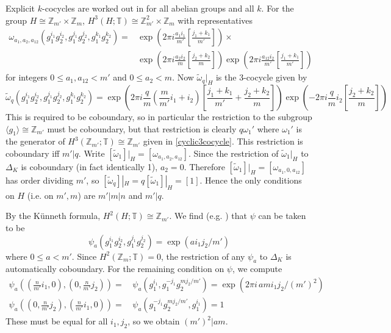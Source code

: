 \documentclass[12pt]{article}
\numberwithin{equation}{section}
\def\bbT           {\mathbb{T}}
\def\bbZ           {\mathbb{Z}}
\begin{document}
Explicit $k$-cocycles are worked out in \cite{HWY} for all abelian groups and all $k$. 
For the group $H\cong\bbZ_{m'}\times\bbZ_m$, $H^3(H;\bbT)\cong \bbZ_{m'}^2\times\bbZ_m$
with representatives
\begin{align}\omega_{a_1,a_2,a_{12}}(g_1^{i_1}g_2^{i_2},g_1^{j_1}g_2^{j_2},g_1^{k_1}g_2^{k_2})=&
\exp\left(2\pi i \frac{a_1i_1}{m'}\left[\frac{j_1+k_1}{m'}\right]\right)\times\nonumber\\ &\exp\left(2\pi i \frac{a_2i_2}{m}\left[\frac{j_2+k_2}{m}\right]\right)
\exp\left(2\pi i \frac{a_{12}i_2}{m'}\left[\frac{j_1+k_1}{m'}\right]\right)\nonumber\end{align}
for integers $0\le a_1,a_{12}<m'$ and $0\le a_2<m$.
Now $\widetilde{\omega}_q|_H$ is the 3-cocycle given by
$$\widetilde{\omega}_q(g_1^{i_1}g_2^{i_2},g_1^{j_1}g_2^{j_2},g_1^{k_1}g_2^{k_2})=\exp\left(2\pi i \frac{q}{m}(\frac{m}{m'}i_1+i_2)\left[\frac{j_1+k_1}{m'}+\frac{j_2+k_2}{m}\right]\right)\exp\left(-2\pi i \frac{q}{m}i_2\left[\frac{j_2+k_2}{m}\right]\right)$$
This is required to be coboundary, so in particular the restriction to the subgroup $\langle g_1\rangle \cong \bbZ_{m'}$ must
be coboundary, but that restriction is clearly $q\omega_1'$ where $\omega_1'$ is the generator of $H^3(\bbZ_{m'};\bbT)\cong\bbZ_{m'}$ given in \eqref{cyclic3cocycle}. This restriction is coboundary iff $m'|q$.
Write $[\tilde{\omega}_1]|_H=[\omega_{a_1,a_2,a_{12}}]$. Since the restriction of $\tilde{\omega}_1|_H$ to $\Delta_K$ is coboundary (in fact identically 1), $a_2=0$. Therefore $[\tilde{\omega}_1]|_H=[\omega_{a_1,0,a_{12}}]$ has order dividing $m'$, so  $[\tilde{\omega}_q]|_H=q[\tilde{\omega}_1]|_H
=[1]$. Hence the only conditions on $H$ (i.e. on $m',m$) are $m'|m|n$ and $m'|q$.

By the K\"unneth formula, $H^2(H;\bbT)\cong \bbZ_{m'}$. We find (e.g. \cite{HWY}) that $\psi$ can be taken to be
$$\psi_a(g_1^{i_1}g_2^{i_2},g_1^{j_1}g_2^{j_2})=\exp\left(ai_1j_2/m'\right)$$ 
where $0\le a<m'$.  Since $H^2(\bbZ_m;\bbT)=0$, the restriction of any $\psi_a$ to $\Delta_K$ is automatically coboundary. For the remaining condition on $\psi$, we compute
\begin{align}\psi_a((\frac{n}{m'}i_1,0),(0,\frac{n}{m'}j_2))=\,&\psi_a(g_1^{i_1},g_1^{-j_1}g_2^{mj_2/m'})=\exp\left(2\pi i\,ami_1j_2/(m')^2\right)\nonumber\\
\psi_a((0,\frac{n}{m'}j_2),(\frac{n}{m'}i_1,0))=\,&\psi_a(g_1^{-j_1}g_2^{mj_2/m'},g_1^{i_1})=1\nonumber\end{align}
These must be equal for all $i_1,j_2$, so we obtain $(m')^2|am$.
\end{document}
